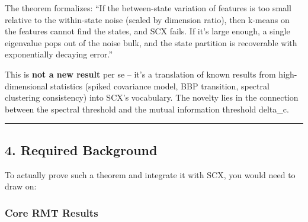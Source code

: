 \documentclass[
  12pt,
]{article}
\begin{document}
The theorem formalizes: ``If the between-state variation of features is
too small relative to the within-state noise (scaled by dimension
ratio), then k-means on the features cannot find the states, and SCX
fails. If it's large enough, a single eigenvalue pops out of the noise
bulk, and the state partition is recoverable with exponentially decaying
error.''

This is \textbf{not a new result} per se -- it's a translation of known
results from high-dimensional statistics (spiked covariance model, BBP
transition, spectral clustering consistency) into SCX's vocabulary. The
novelty lies in the connection between the spectral threshold and the
mutual information threshold delta\_c.

\begin{center}\rule{0.5\linewidth}{0.5pt}\end{center}

\subsection{4. Required Background}\label{required-background}

To actually prove such a theorem and integrate it with SCX, you would
need to draw on:

\subsubsection{Core RMT Results}\label{core-rmt-results}
\end{document}
